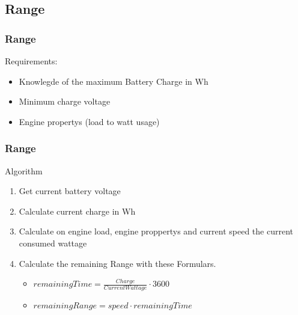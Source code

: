 \documentclass{beamer}
\begin{document}
\subsection{Range}
\begin{frame}
    \frametitle{Range}
    Requirements:
    \begin{itemize}
        \item Knowlegde of the maximum Battery Charge in Wh
        \item Minimum charge voltage
        \item Engine propertys (load to watt usage)
    \end{itemize}
\end{frame}
\begin{frame}
    \frametitle{Range}
    Algorithm
    \begin{enumerate}
     \item Get current battery voltage
     \item Calculate current charge in Wh
     \item Calculate on engine load, engine proppertys and current speed the current consumed wattage
     \item Calculate the remaining Range with these Formulars.
     \begin{itemize}
        \item $remainingTime=\frac{Charge}{Current Wattage}\cdot3600$
        \item $remainingRange=speed\cdot remainingTime$
     \end{itemize}
    \end{enumerate}
\end{frame}
\end{document}
